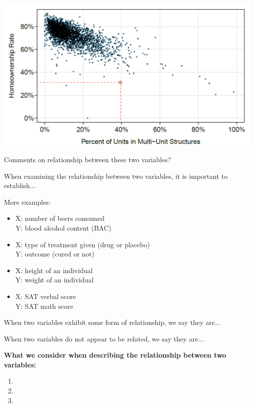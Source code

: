 \documentclass[11pt,letterpaper,twoside]{article}
\begin{document}
\begin{center}
\includegraphics[scale=0.7]{images/scatter2.png}
\end{center}
\vspace{-10pt}
Comments on relationship between these two variables?

\newpage

When examining the relationship between two variables, it is important to establish... \vspace{200pt}

More examples:

\begin{itemize}
\item X: number of beers consumed \\
	Y: blood alcohol content (BAC)
\item X: type of treatment given (drug or placebo) \\
	Y: outcome (cured or not)
\item X: height of an individual \\
	Y: weight of an individual
\item X: SAT verbal score \\
	Y: SAT math score \vspace{40pt}
\end{itemize}

When two variables exhibit some form of relationship, we say they are... \vspace{60pt}

When two variables do not appear to be related, we say they are...

\newpage

{\bf What we consider when describing the relationship between two variables:}
\begin{enumerate}
\item 

\item \vspace{80pt}

\item \vspace{80pt}
\end{enumerate}
\end{document}
